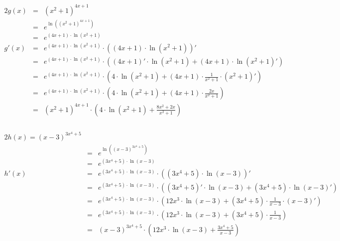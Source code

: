 \documentclass[10pt,a4paper,oneside,ngerman,numbers=noenddot]{scrartcl}
\begin{document}
\subsection{} %
\subsubsection{} %
\begin{alignat*}{2}
g(x) &=& (x^{2}+1)^{4x+1} \\
&=& e^{\ln \left( (x^{2}+1)^{4x+1}\right)} \\
&=& e^{(4x+1) \cdot \ln (x^{2}+1)} \\
g'(x) &=& e^{(4x+1) \cdot \ln (x^{2}+1)} \cdot \left((4x+1) \cdot \ln (x^{2}+1) \right)' \\
&=& e^{(4x+1) \cdot \ln (x^{2}+1)} \cdot \left((4x+1)' \cdot \ln (x^{2}+1) + (4x+1) \cdot \ln (x^{2}+1)' \right) \\
&=& e^{(4x+1) \cdot \ln (x^{2}+1)} \cdot \left(4 \cdot \ln (x^{2}+1) + (4x+1) \cdot \frac{1}{x^{2}+1} \cdot (x^{2}+1)' \right) \\
&=& e^{(4x+1) \cdot \ln (x^{2}+1)} \cdot \left(4 \cdot \ln (x^{2}+1) + (4x+1) \cdot \frac{2x}{x^{2}+1} \right) \\
&=& (x^{2}+1)^{4x+1} \cdot \left(4 \cdot \ln (x^{2}+1) + \frac{8x^{2} + 2x}{x^{2}+1} \right)
\end{alignat*}
\subsubsection{} %
\begin{alignat*}{2}
h(x) = (x-3)^{3x^{4}+5} \\
&=& e^{\ln \left((x-3)^{3x^{4}+5} \right)} \\
&=& e^{(3x^{4}+5) \cdot \ln (x-3)} \\
h'(x) &=& e^{(3x^{4}+5) \cdot \ln (x-3)} \cdot \left((3x^{4}+5) \cdot \ln (x-3) \right)' \\
&=& e^{(3x^{4}+5) \cdot \ln (x-3)} \cdot \left((3x^{4}+5)' \cdot \ln (x-3) + (3x^{4}+5) \cdot \ln (x-3)' \right) \\
&=& e^{(3x^{4}+5) \cdot \ln (x-3)} \cdot \left(12x^{3} \cdot \ln (x-3) + (3x^{4}+5) \cdot \frac{1}{x-3} \cdot (x-3)' \right) \\
&=& e^{(3x^{4}+5) \cdot \ln (x-3)} \cdot \left(12x^{3} \cdot \ln (x-3) + (3x^{4}+5) \cdot \frac{1}{x-3} \right) \\
&=& (x-3)^{3x^{4}+5} \cdot \left(12x^{3} \cdot \ln (x-3) + \frac{3x^{4}+5}{x-3} \right)
\end{alignat*}
\end{document}
